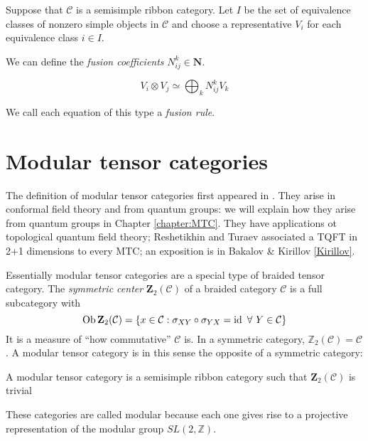     Suppose that $\mathcal{C}$ is a semisimple ribbon category. Let $I$ be the
    set of equivalence classes of nonzero simple objects in $\mathcal{C}$ and
    choose a representative $V_i$ for each equivalence class  $i \in I$.
    
    We can define the \emph{fusion coefficients} $N_{ij}^k \in \mathbf{N}$.

    \begin{equation}
        V_i \otimes V_j \simeq \bigoplus_k N_{ij}^k V_k
    \end{equation}

    We call each equation of this type a \emph{fusion rule}. 

\section{Modular tensor categories}
\label{section:MTCs}

    The definition of modular tensor categories first appeared in \cite{MS}.
    They arise in conformal field theory and from quantum groups: we will
    explain how they arise from quantum groups in Chapter \ref{chapter:MTC}.
    They have applications ot topological quantum field theory; Reshetikhin and
    Turaev associated a TQFT in 2+1 dimensions to every MTC; an exposition is
    in Bakalov \& Kirillov \ref{Kirillov}.

    Essentially modular tensor categories are a special type of braided tensor
    category.  The \emph{symmetric center} $\mathbf{Z}_2(\mathcal{C})$ of a
    braided category $\mathcal{C}$ is a full subcategory with 
    \begin{equation}
        \operatorname{Ob} \mathbf{Z}_2(\mathcal{C}) = \left\{ x \in \mathcal{C} : \sigma_{XY} \circ \sigma_{YX} = \operatorname{id}\ \forall\ Y \in \mathcal{C} \right\}
    \end{equation}
    It is a measure of ``how commutative'' $\mathcal{C}$ is. In a symmetric
    category, $\mathbb{Z}_2(\mathcal{C}) = \mathcal{C}$. A modular tensor
    category is in this sense the opposite of a symmetric category:

\begin{defn}
    A modular tensor category is a semisimple ribbon category such that
    $\mathbf{Z}_2(\mathcal{C})$ is trivial
\end{defn}

These categories are called modular because each one gives rise to a projective representation of the modular group $SL(2, \mathbb{Z})$.

